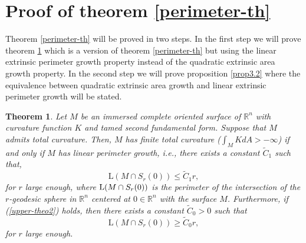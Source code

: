 \documentclass[a4paper]{amsart}
\newtheorem{theorem}{Theorem}[section]
\theoremstyle{definition}
\numberwithin{equation}{section}
\begin{document}
\section{Proof of theorem \ref{perimeter-th}}
Theorem \ref{perimeter-th} will be proved in two steps. In the first step we will prove theorem \ref{theo3.1} which is a version of theorem \ref{perimeter-th} but using the linear extrinsic perimeter growth property instead of the quadratic extrinsic area growth property. In the second step we will prove proposition \ref{prop3.2} where the equivalence between quadratic extrinsic area growth and linear extrinsic perimeter growth will be stated.
\begin{theorem}\label{theo3.1}Let $M$ be an immersed complete oriented  surface of $\mathbb{R}^{n}$ with curvature function $K$ and tamed second fundamental form. Suppose that $M$  admits total curvature. Then, $M$ has finite total curvature ($\int_MKdA>-\infty$) if and only if
$M$ has linear perimeter growth, \emph{i.e.}, there exists a constant $\widetilde C_1$ such that,
\begin{equation}\label{upper-theo2}
\text{L}(M\cap S_r(0))\leq \widetilde C_1 r,
\end{equation}
for $r$ large enough, where ${\rm L}(M\cap S_r(0))$ is the perimeter of the intersection of the $r$-geodesic sphere in ${\mathbb{R}}^n$ centered at $0\in {\mathbb{R}}^n$ with the surface $M$. Furthermore, if (\ref{upper-theo2}) holds, then there exists a constant $\widetilde C_0>0$ such that
\begin{equation}
\text{L}(M\cap S_r(0))\geq \widetilde C_0 r,
\end{equation}
for $r$ large enough.
\end{theorem}
\end{document}
